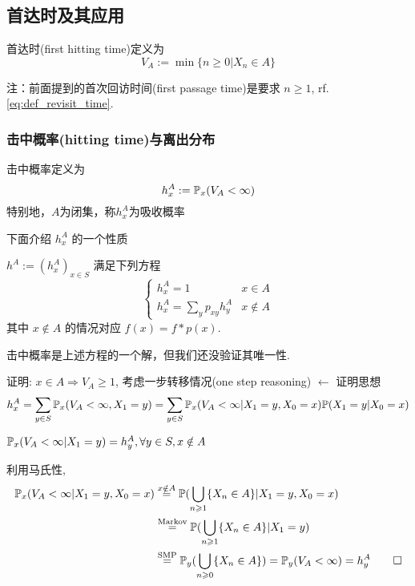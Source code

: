 \subsection{首达时及其应用}

\begin{definition}[首达时]
    首达时(first hitting time)定义为
    \begin{equation}
        V_A:=\min\{n\geq 0|X_n\in A\}
        \label{eq:FHT}
    \end{equation}
\end{definition}

注：前面提到的首次回访时间(first passage time)是要求 $n\geq 1$, rf.\eqref{eq:def_revisit_time}.

\subsubsection{击中概率(hitting time)与离出分布}

\begin{definition}[击中概率]
    击中概率定义为
    \begin{equation}
        h_x^A:=\mathbb{P}_x(V_A<\infty)
        \label{eq:HT}
    \end{equation}
    特别地，$A$为闭集，称$h_x^A$为吸收概率
\end{definition}

下面介绍 $h_x^A$ 的一个性质

\begin{lemma}
    $h^A:=(h_x^A)_{x\in S}$ 满足下列方程
    \[
    \begin{cases}
        h_x^A=1 & x\in A\\
        h_x^A=\sum_y p_{xy}h_y^A & x\notin A
    \end{cases}
    \]
    其中 $x\notin A$ 的情况对应 $f(x)=f*p(x)$.
\end{lemma}

击中概率是上述方程的一个解，但我们还没验证其唯一性.

证明: $x\in A\Rightarrow V_A\geq 1$, 考虑一步转移情况(one step reasoning) $\leftarrow$ 证明思想
\[
h_x^A=\sum_{y\in S}\mathbb{P}_x(V_A<\infty, X_1=y)=\sum_{y\in S}\mathbb{P}_x(V_A<\infty| X_1=y,X_0=x)\mathbb{P}(X_1=y|X_0=x)
\]
\begin{claim}
$\mathbb{P}_x(V_A<\infty|X_1=y)=h_y^A,\forall y\in S, x\notin A$
\end{claim}
利用马氏性,
\[
\begin{aligned}
    \mathbb{P}_x(V_A<\infty| X_1=y,X_0=x) &\overset{x\notin A}{=}\mathbb{P}(\bigcup_{n\geqslant 1}\{X_n\in A\}|X_1=y,X_0=x)\\
    &\overset{\text{Markov}}{=}\mathbb{P}(\bigcup_{n\geqslant 1}\{X_n\in A\}|X_1=y)\\
    &\overset{\text{SMP}}{=}\mathbb{P}_y(\bigcup_{n\geqslant 0}\{X_n\in A\})=\mathbb{P}_y(V_A<\infty)=h_y^A\qed
\end{aligned}
\]

